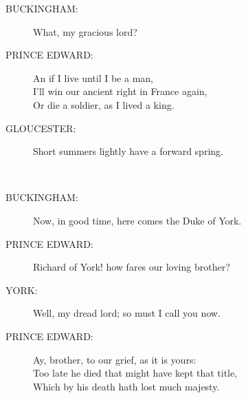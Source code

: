 \documentclass{article}
\begin{document}
\begin{description}
\item[BUCKINGHAM:] 
\hspace{1pt}What, my gracious lord?\\
\end{description}
\begin{description}
\item[PRINCE EDWARD:] 
\hspace{1pt}An if I live until I be a man,\\
\hspace{1pt}I'll win our ancient right in France again,\\
\hspace{1pt}Or die a soldier, as I lived a king.\\
\end{description}
\begin{description}
\item[GLOUCESTER:] 
\hspace{1pt}  Short summers lightly have a forward spring.\\
\end{description}
\\
\begin{description}
\item[BUCKINGHAM:] 
\hspace{1pt}Now, in good time, here comes the Duke of York.\\
\end{description}
\begin{description}
\item[PRINCE EDWARD:] 
\hspace{1pt}Richard of York! how fares our loving brother?\\
\end{description}
\begin{description}
\item[YORK:] 
\hspace{1pt}Well, my dread lord; so must I call you now.\\
\end{description}
\begin{description}
\item[PRINCE EDWARD:] 
\hspace{1pt}Ay, brother, to our grief, as it is yours:\\
\hspace{1pt}Too late he died that might have kept that title,\\
\hspace{1pt}Which by his death hath lost much majesty.\\
\end{description}
\end{document}
